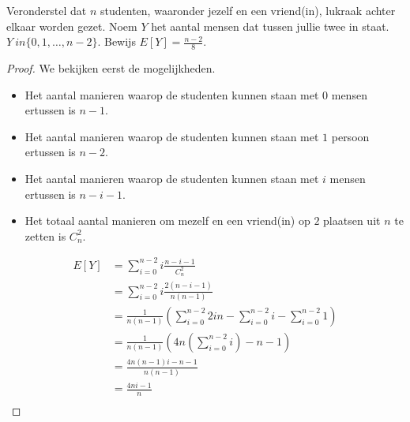 \documentclass[main.tex]{subfiles}
\begin{document}
\begin{oef}
  Veronderstel dat $n$ studenten, waaronder jezelf en een vriend(in), lukraak achter elkaar worden gezet.
  Noem $Y$ het aantal mensen dat tussen jullie twee in staat. $Y \
in \{ 0,1,\dotsc,n-2 \}$.
  Bewijs $E[Y] =\frac{n-2}{8}$.

  \begin{proof}
    We bekijken eerst de mogelijkheden.
    \begin{itemize}
    \item Het aantal manieren waarop de studenten kunnen staan met $0$ mensen ertussen is $n-1$.
    \item Het aantal manieren waarop de studenten kunnen staan met $1$ persoon ertussen is $n-2$.
    \item Het aantal manieren waarop de studenten kunnen staan met $i$ mensen ertussen is $n-i-1$.
    \item Het totaal aantal manieren om mezelf en een vriend(in) op $2$ plaatsen uit $n$ te zetten is $C_{n}^{2}$.
    \end{itemize}
    \[
    \begin{array}{rl}
      E[Y]
      &= \sum_{i=0}^{n-2}i \frac{n-i-1}{C_{n}^{2}}\\
      &= \sum_{i=0}^{n-2}i\frac{2(n-i-1)}{n(n-1)}\\
      &= \frac{1}{n(n-1)}\left(\sum_{i=0}^{n-2}2in-\sum_{i=0}^{n-2}i-\sum_{i=0}^{n-2}1\right)\\
      &= \frac{1}{n(n-1)}\left(4n\left(\sum_{i=0}^{n-2}i\right)-n-1\right)\\
      &= \frac{4n(n-1)i-n-1}{n(n-1)}\\
      &= \frac{4ni-1}{n}\\
    \end{array}
    \]


\end{proof}
\end{oef}
\end{document}
